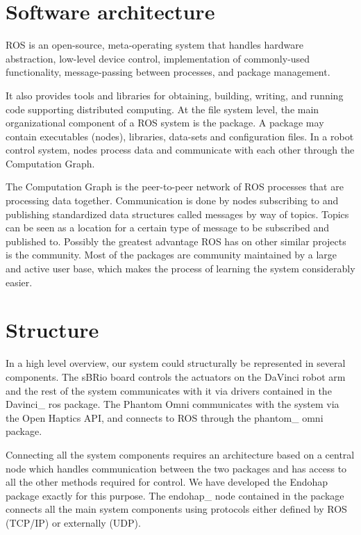 \section{Software architecture}
ROS is an open-source, meta-operating system that handles
hardware abstraction, low-level device control, implementation
of commonly-used functionality, message-passing between
processes, and package management.

 It also provides tools and libraries for obtaining, building, writing, and running code supporting distributed computing. At the file system level, the main organizational component of a ROS system
is the package. A package may contain executables (nodes),
libraries, data-sets and configuration files. In a robot control
system, nodes process data and communicate with each other
through the Computation Graph.

The Computation Graph is the peer-to-peer network of ROS
processes that are processing data together. Communication
is done by nodes subscribing to and publishing standardized
data structures called messages by way of topics. Topics can
be seen as a location for a certain type of message to be
subscribed and published to. Possibly the greatest advantage
ROS has on other similar projects is the community. Most of
the packages are community maintained by a large and active
user base, which makes the process of learning the system
considerably easier.

\section*{Structure}

In a high level overview, our system could structurally be represented in several components.
The sBRio board controls the actuators on the DaVinci robot arm and the rest of the system communicates with it via drivers contained in the Davinci\_ ros package. The Phantom Omni communicates with the system via the Open Haptics API, and connects to ROS through the phantom\_ omni package.

Connecting all the system components requires an architecture based on a central node which handles communication between the two packages and has access to all the other methods required for control.
We have developed the Endohap package exactly for this purpose.
The endohap\_ node contained in the package connects all the main system components using protocols either defined by ROS (TCP/IP) or externally (UDP). 

